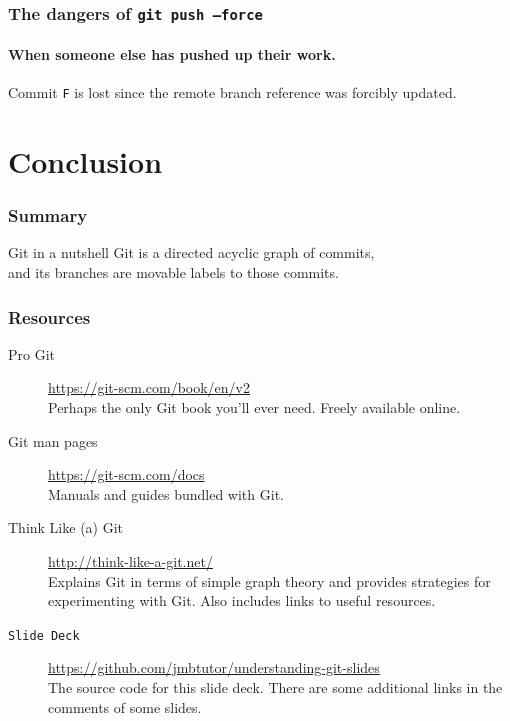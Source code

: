 \documentclass{beamer}
\newcommand\gitcmd[1]{\texttt{git #1}}
\newcommand\grefspec[1]{\texttt{#1}}
\begin{document}
\begin{frame}
  \frametitle{The dangers of \gitcmd{push --force}}
  \framesubtitle{When someone else has pushed up their work.}

  \begin{figure}
    \centering
  \end{figure}

  Commit \grefspec{F} is lost since the remote branch reference was forcibly updated.
\end{frame}

\section{Conclusion}

\begin{frame}
  \frametitle{Summary}
  \begin{block}{Git in a nutshell}
    Git is a directed acyclic graph of commits,\\
    and its branches are movable labels to those commits.
  \end{block}
\end{frame}

\begin{frame}
  \frametitle{Resources}
  \begin{description}
    \item[Pro Git] \url{https://git-scm.com/book/en/v2}\\
      Perhaps the only Git book you'll ever need. Freely available online.
    \item[Git man pages] \url{https://git-scm.com/docs}\\
      Manuals and guides bundled with Git.
    \item[Think Like (a) Git] \url{http://think-like-a-git.net/}\\
      Explains Git in terms of simple graph theory and provides strategies for experimenting with Git. Also includes links to useful resources.
    \item[\texttt{Slide Deck}] \url{https://github.com/jmbtutor/understanding-git-slides}\\
      The source code for this slide deck. There are some additional links in the comments of some slides.
  \end{description}
\end{frame}
\end{document}
